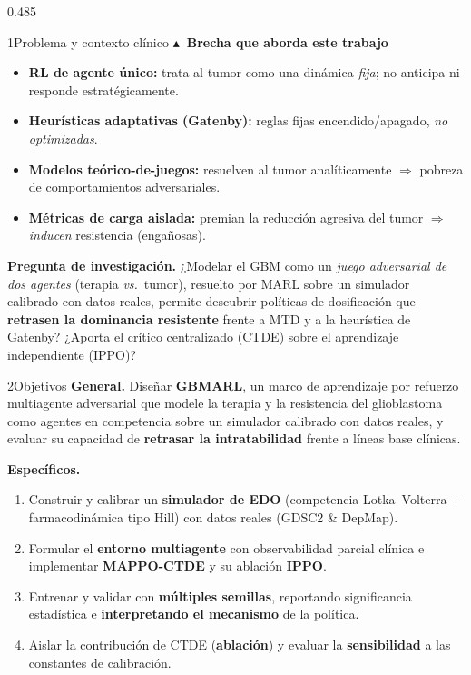 \documentclass[final]{beamer}
\begin{document}
\begin{frame}[t]
\begin{columns}[t]
\begin{column}{0.485\textwidth}
\begin{pblock}{1}{Problema y contexto clínico}
\vspace{2mm}
\textbf{\color{uneg}$\blacktriangle$\ Brecha que aborda este trabajo}
\begin{itemize}\itemsep2pt
  \item \textbf{RL de agente único:} trata al tumor como una dinámica \emph{fija}; no anticipa ni responde estratégicamente.
  \item \textbf{Heurísticas adaptativas (Gatenby):} reglas fijas encendido/apagado, \emph{no optimizadas}.
  \item \textbf{Modelos teórico-de-juegos:} resuelven al tumor analíticamente $\Rightarrow$ pobreza de comportamientos adversariales.
  \item \textbf{Métricas de carga aislada:} premian la reducción agresiva del tumor $\Rightarrow$ \emph{inducen} resistencia (engañosas).
\end{itemize}

\vspace{2mm}
\begin{softbox}
\textbf{\color{udark}Pregunta de investigación.} ¿Modelar el GBM como un \emph{juego adversarial de dos agentes} (terapia \emph{vs.}\ tumor), resuelto por MARL sobre un simulador calibrado con datos reales, permite descubrir políticas de dosificación que \textbf{retrasen la dominancia resistente} frente a MTD y a la heurística de Gatenby? ¿Aporta el crítico centralizado (CTDE) sobre el aprendizaje independiente (IPPO)?
\end{softbox}
\end{pblock}

\vspace{23mm}

\begin{pblock}{2}{Objetivos}
\textbf{\color{udark}General.} Diseñar \textbf{GBMARL}, un marco de aprendizaje por refuerzo multiagente adversarial que modele la terapia y la resistencia del glioblastoma como agentes en competencia sobre un simulador calibrado con datos reales, y evaluar su capacidad de \textbf{retrasar la intratabilidad} frente a líneas base clínicas.

\vspace{2mm}
\textbf{\color{udark}Específicos.}
\begin{enumerate}\itemsep1pt
  \item Construir y calibrar un \textbf{simulador de EDO} (competencia Lotka--Volterra + farmacodinámica tipo Hill) con datos reales (GDSC2 \& DepMap).
  \item Formular el \textbf{entorno multiagente} con observabilidad parcial clínica e implementar \textbf{MAPPO-CTDE} y su ablación \textbf{IPPO}.
  \item Entrenar y validar con \textbf{múltiples semillas}, reportando significancia estadística e \textbf{interpretando el mecanismo} de la política.
  \item Aislar la contribución de CTDE (\textbf{ablación}) y evaluar la \textbf{sensibilidad} a las constantes de calibración.
\end{enumerate}
\end{pblock}


\end{column}
\end{columns}
\end{frame}
\end{document}
